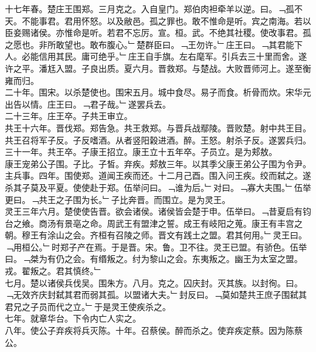 \documentclass{zhvt-classic}
\begin{document}
\hspace*{2em}十七年春。楚庄王围郑。三月克之。入自皇门。郑伯肉袒牵羊以逆。曰。﹁孤不天。不能事君。君用怀怒。以及敝邑。孤之罪也。敢不惟命是听。宾之南海。若以臣妾赐诸侯。亦惟命是听。若君不忘厉。宣。桓。武。不绝其社稷。使改事君。孤之愿也。非所敢望也。敢布腹心。﹂楚群臣曰。﹁王勿许。﹂庄王曰。﹁其君能下人。必能信用其民。庸可绝乎。﹂庄王自手旗。左右麾军。引兵去三十里而舍。遂许之平。潘尪入盟。子良出质。夏六月。晋救郑。与楚战。大败晋师河上。遂至衡雍而归。\\
\hspace*{2em}二十年。围宋。以杀楚使也。围宋五月。城中食尽。易子而食。析骨而炊。宋华元出告以情。庄王曰。﹁君子哉。﹂遂罢兵去。\\
\hspace*{2em}二十三年。庄王卒。子共王审立。\\
\hspace*{2em}共王十六年。晋伐郑。郑告急。共王救郑。与晋兵战鄢陵。晋败楚。射中共王目。共王召将军子反。子反嗜酒。从者竖阳榖进酒。醉。王怒。射杀子反。遂罢兵归。\\
\hspace*{2em}三十一年。共王卒。子康王招立。康王立十五年卒。子员立。是为郏敖。\\
\hspace*{2em}康王宠弟公子围。子比。子皙。弃疾。郏敖三年。以其季父康王弟公子围为令尹。主兵事。四年。围使郑。道闻王疾而还。十二月己酉。围入问王疾。绞而弑之。遂杀其子莫及平夏。使使赴于郑。伍举问曰。﹁谁为后。﹂对曰。﹁寡大夫围。﹂伍举更曰。﹁共王之子围为长。﹂子比奔晋。而围立。是为灵王。\\
\hspace*{2em}灵王三年六月。楚使使告晋。欲会诸侯。诸侯皆会楚于申。伍举曰。﹁昔夏启有钧台之飨。商汤有景亳之命。周武王有盟津之誓。成王有岐阳之蒐。康王有丰宫之朝。穆王有涂山之会。齐桓有召陵之师。晋文有践土之盟。君其何用。﹂灵王曰。﹁用桓公。﹂时郑子产在焉。于是晋。宋。鲁。卫不往。灵王已盟。有骄色。伍举曰。﹁桀为有仍之会。有缗叛之。纣为黎山之会。东夷叛之。幽王为太室之盟。戎。翟叛之。君其慎终。﹂\\
\hspace*{2em}七月。楚以诸侯兵伐吴。围朱方。八月。克之。囚庆封。灭其族。以封徇。曰。﹁无效齐庆封弑其君而弱其孤。以盟诸大夫。﹂封反曰。﹁莫如楚共王庶子围弑其君兄之子员而代之立。﹂于是灵王使疾杀之。\\
\hspace*{2em}七年。就章华台。下令内亡人实之。\\
\hspace*{2em}八年。使公子弃疾将兵灭陈。十年。召蔡侯。醉而杀之。使弃疾定蔡。因为陈蔡公。\\
\end{document}
